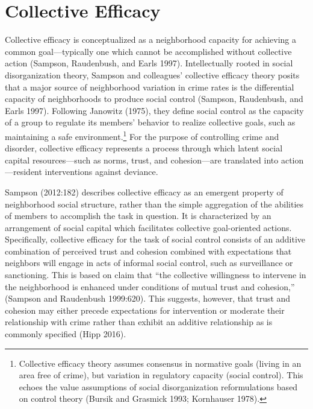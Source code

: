 \documentclass [11pt, proquest] {uwthesis}[2015/03/03]
\begin{document}
\hypertarget{collective-efficacy}{%
\section{Collective Efficacy}\label{collective-efficacy}}

Collective efficacy is conceptualized as a neighborhood capacity for achieving a common goal---typically one which cannot be accomplished without collective action (Sampson, Raudenbush, and Earls 1997). Intellectually rooted in social disorganization theory, Sampson and colleagues' collective efficacy theory posits that a major source of neighborhood variation in crime rates is the differential capacity of neighborhoods to produce social control (Sampson, Raudenbush, and Earls 1997). Following Janowitz (1975), they define social control as the capacity of a group to regulate its members' behavior to realize collective goals, such as maintaining a safe environment.\footnote{Collective efficacy theory assumes consensus in normative goals (living in an area free of crime), but variation in regulatory capacity (social control). This echoes the value assumptions of social disorganization reformulations based on control theory (Bursik and Grasmick 1993; Kornhauser 1978).} For the purpose of controlling crime and disorder, collective efficacy represents a process through which latent social capital resources---such as norms, trust, and cohesion---are translated into action---resident interventions against deviance.

Sampson (2012:182) describes collective efficacy as an emergent property of neighborhood social structure, rather than the simple aggregation of the abilities of members to accomplish the task in question. It is characterized by an arrangement of social capital which facilitates collective goal-oriented actions. Specifically, collective efficacy for the task of social control consists of an additive combination of perceived trust and cohesion combined with expectations that neighbors will engage in acts of informal social control, such as surveillance or sanctioning. This is based on claim that ``the collective willingness to intervene in the neighborhood is enhanced under conditions of mutual trust and cohesion,'' (Sampson and Raudenbush 1999:620). This suggests, however, that trust and cohesion may either precede expectations for intervention or moderate their relationship with crime rather than exhibit an additive relationship as is commonly specified (Hipp 2016).
\end{document}

